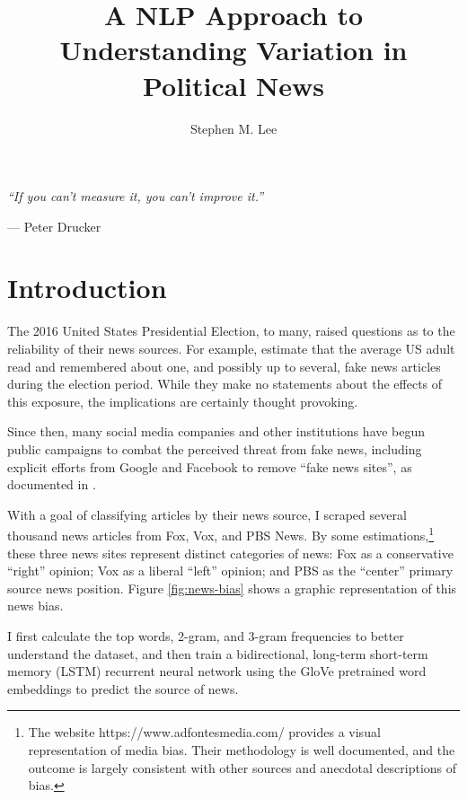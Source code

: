 \documentclass{article}
\author{Stephen M. Lee}
\title{A NLP Approach to Understanding Variation in Political News}
\begin{document}
	\maketitle 
	
	\newpage
	
	\tableofcontents
	
	\newpage
	
	\begin{center}
		\textit{``If you can't measure it, you can't improve it.''}
	\end{center}
    \begin{flushright}
    	--- Peter Drucker
    \end{flushright}
	
	\section{Introduction}
		The 2016 United States Presidential Election, to many, raised questions as to the reliability of their news sources. For example, \citet{allcott2017social} estimate that the average US adult read and remembered about one, and possibly up to several, fake news articles during the election period. While they make no statements about the effects of this exposure, the implications are certainly thought provoking. 
		
		Since then, many social media companies and other institutions have begun public campaigns to combat the perceived threat from fake news, including explicit efforts from Google and Facebook to remove ``fake news sites'', as documented in \citet{allcott2017social}. 
		
		With a goal of classifying articles by their news source, I scraped several thousand news articles from Fox, Vox, and PBS News. By some estimations,\footnote{The website https://www.adfontesmedia.com/ provides a visual representation of media bias. Their methodology is well documented, and the outcome is largely consistent with other sources and anecdotal descriptions of bias.} these three news sites represent distinct categories of news: Fox as a conservative “right” opinion; Vox as a liberal “left” opinion; and PBS as the “center” primary source news position. Figure \ref{fig:news-bias} shows a graphic representation of this news bias. 
		
		I first calculate the top words, 2-gram, and 3-gram frequencies to better understand the dataset, and then train a bidirectional, long-term short-term memory (LSTM) recurrent neural network using the GloVe pretrained word embeddings to predict the source of news. 
		
\end{document}
